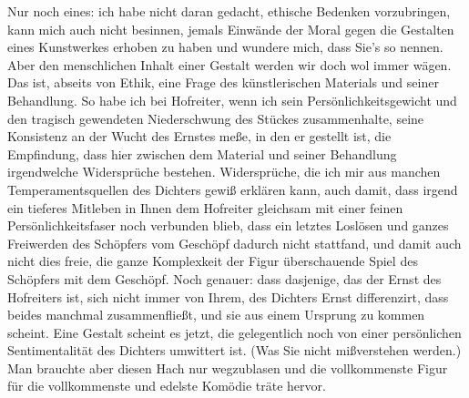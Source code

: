 \pstart
           Nur noch eines: ich habe nicht daran gedacht, ethische Bedenken vorzubringen, kann
               mich auch nicht besinnen, jemals Einwände der Moral gegen die Gestalten eines
               Kunstwerkes erhoben zu haben und wundere mich, dass Sie’s so nennen. Aber den
               menschlichen Inhalt einer Gestalt werden wir doch wol immer wägen. Das ist, abseits
               von Ethik, eine Frage des künstlerischen Materials und seiner Behandlung. So habe ich
               bei Hofreiter, wenn ich sein
               Persönlichkeitsgewicht und den tragisch gewendeten Niederschwung des Stückes zusammenhalte, seine Konsistenz an
               der Wucht des Ernstes meße, in den er gestellt ist, die {\pb}Empfindung, dass hier zwischen
               dem Material und seiner Behandlung irgendwelche Widersprüche bestehen. Widersprüche,
               die ich mir aus manchen Temperamentsquellen des Dichters gewiß erklären kann, auch
               damit, dass irgend ein tieferes Mitleben in Ihnen dem Hofreiter gleichsam mit einer feinen Persönlichkeitsfaser
               noch verbunden blieb, dass ein letztes Loslösen und ganzes Freiwerden des Schöpfers
               vom Geschöpf dadurch nicht stattfand, und damit auch nicht dies freie, die ganze
               Komplexkeit der Figur überschauende Spiel des Schöpfers mit dem Geschöpf. Noch
               genauer: dass dasjenige, das der Ernst des Hofreiters ist, sich nicht immer von Ihrem, des Dichters
               Ernst differenzirt, dass beides manchmal zusammenfließt, und sie aus einem Ursprung
               zu kommen scheint. Eine Gestalt scheint es jetzt, die gelegentlich noch von einer
               persönlichen Sentimentalität des Dichters umwittert ist. (Was Sie nicht mißverstehen
               werden.) Man brauchte aber diesen Hach nur wegzublasen und die vollkommenste Figur
               für die vollkommenste und edelste Komödie träte hervor.\pend
           
